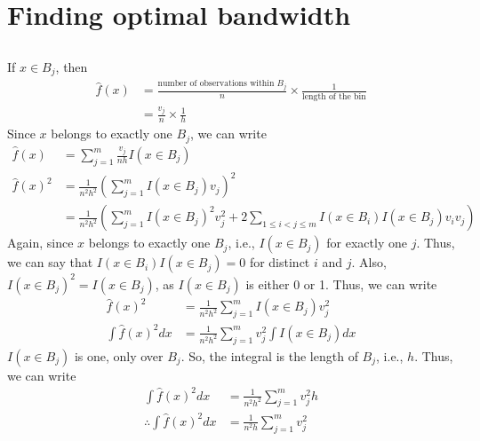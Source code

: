 \section{Finding optimal bandwidth}
\subsection{}
If $x\in B_j$, then
\begin{align*}
	\hat{f}(x) & = \frac{\textrm{number of observations within }B_j}{n} \times \frac{1}{\textrm{length of the bin}} \\
	           & =  \frac{v_j}{n} \times \frac{1}{h}
\end{align*}
Since $x$ belongs to exactly one $B_j$, we can write
\begin{align*}
	\hat{f}(x)   & = \sum_{j=1}^m \frac{v_j}{nh} I(x\in B_j)                                                                                      \\
	\hat{f}(x)^2 & = \frac{1}{n^2h^2} \left(\sum_{j=1}^m I(x\in B_j) v_j \right)^2                                                                \\
	             & = \frac{1}{n^2h^2} \left(\sum_{j=1}^m I(x\in B_j)^2 v_j^2 + 2\sum_{1\leq i < j \leq m} I(x \in B_i)I(x \in B_j)v_i v_j \right)
\end{align*}
Again, since $x$ belongs to exactly one $B_j$, i.e., $I(x\in B_j)$ for exactly one $j$. Thus, we can say that $I(x\in B_i) I(x\in B_j) = 0$ for distinct $i$ and $j$.
Also, $I(x\in B_j)^2 = I(x\in B_j)$, as $I(x\in B_j)$ is either 0 or 1. Thus, we can write
\begin{align*}
	\hat{f}(x)^2         & = \frac{1}{n^2h^2} \sum_{j=1}^m I(x\in B_j) v_j^2         \\
	\int \hat{f}(x)^2 dx & = \frac{1}{n^2h^2} \sum_{j=1}^m v_j^2 \int I(x\in B_j) dx
\end{align*}
$I(x\in B_j)$ is one, only over $B_j$. So, the integral is the length of $B_j$, i.e., $h$. Thus, we can write
\begin{align*}
	\int \hat{f}(x)^2 dx            & = \frac{1}{n^2h^2} \sum_{j=1}^m v_j^2 h \\
	\therefore \int \hat{f}(x)^2 dx & = \frac{1}{n^2h} \sum_{j=1}^m v_j^2
\end{align*}
\subsection{}

